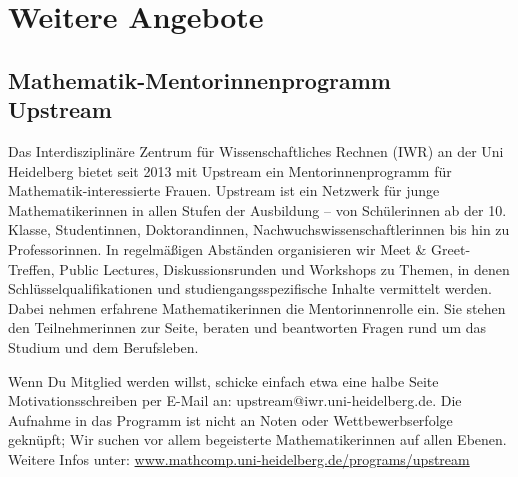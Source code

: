 \section{Weitere Angebote}

\subsection{Mathematik-Mentorinnenprogramm \\Upstream}
Das Interdisziplinäre Zentrum für Wissenschaftliches Rechnen (IWR) an der Uni Heidelberg bietet seit 2013 mit Upstream ein Mentorinnenprogramm für Mathematik-interessierte Frauen. Upstream ist ein Netzwerk für junge Mathematikerinnen in allen Stufen der Ausbildung -- von Schülerinnen ab der 10. Klasse, Studentinnen, Doktorandinnen, Nachwuchswissenschaftlerinnen bis hin zu Professorinnen. In regelmäßigen Abständen organisieren wir Meet \& Greet-Treffen, Public Lectures, Diskussionsrunden und Workshops zu Themen, in denen Schlüsselqualifikationen und studiengangsspezifische Inhalte vermittelt werden. Dabei nehmen erfahrene Mathematikerinnen die Mentorinnenrolle ein. Sie stehen den Teilnehmerinnen zur Seite, beraten und beantworten Fragen rund um das Studium und dem Berufsleben.

Wenn Du Mitglied werden willst, schicke einfach etwa eine halbe Seite Motivationsschreiben per E-Mail an: upstream@iwr.uni-heidelberg.de. Die Aufnahme in das Programm ist nicht an Noten oder Wettbewerbserfolge geknüpft; Wir suchen vor allem begeisterte Mathematikerinnen auf allen Ebenen. Weitere Infos unter: \url{www.mathcomp.uni-heidelberg.de/programs/upstream}

